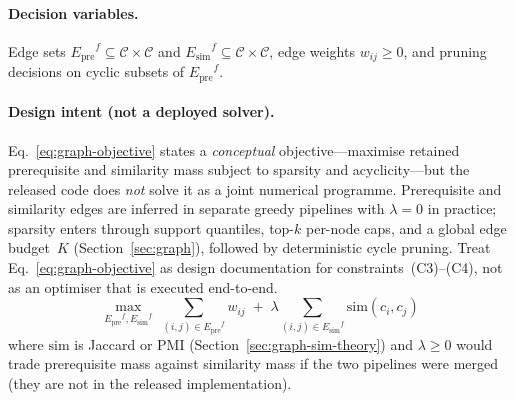 \documentclass[pdflatex,sn-mathphys-num]{sn-jnl}
\newcommand{\Epre}{\ensuremath{E_{\text{pre}}}}
\newcommand{\Esim}{\ensuremath{E_{\text{sim}}}}
\begin{document}
\paragraph{Decision variables.}
Edge sets $\Epre^f\subseteq\mathcal{C}\times\mathcal{C}$ and
$\Esim^f\subseteq\mathcal{C}\times\mathcal{C}$, edge weights
$w_{ij}\ge 0$, and pruning decisions on cyclic subsets of $\Epre^f$.

\paragraph{Design intent (not a deployed solver).}
Eq.~\eqref{eq:graph-objective} states a \emph{conceptual} objective---maximise
retained prerequisite and similarity mass subject to sparsity and acyclicity---but
the released code does \emph{not} solve it as a joint numerical programme.
Prerequisite and similarity edges are inferred in separate greedy pipelines with
$\lambda{=}0$ in practice; sparsity enters through support quantiles, top-$k$
per-node caps, and a global edge budget~$K$ (Section~\ref{sec:graph}), followed
by deterministic cycle pruning. Treat Eq.~\eqref{eq:graph-objective} as design
documentation for constraints~(C3)--(C4), not as an optimiser that is executed
end-to-end.
\begin{equation}
\max_{\Epre^f,\Esim^f}\;
\sum_{(i,j)\in\Epre^f} w_{ij}
\;+\;
\lambda \sum_{(i,j)\in\Esim^f} \mathrm{sim}(c_i,c_j)
\label{eq:graph-objective}
\end{equation}
where $\mathrm{sim}$ is Jaccard or PMI (Section~\ref{sec:graph-sim-theory})
and $\lambda\ge 0$ would trade prerequisite mass against similarity mass if the
two pipelines were merged (they are not in the released implementation).
\end{document}
